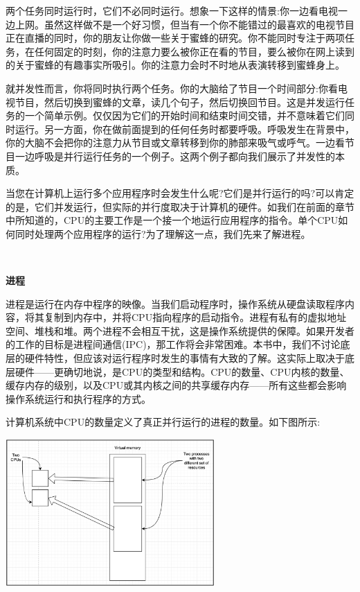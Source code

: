两个任务同时运行时，它们不必同时运行。想象一下这样的情景:你一边看电视一边上网。虽然这样做不是一个好习惯，但当有一个你不能错过的最喜欢的电视节目正在直播的同时，你的朋友让你做一些关于蜜蜂的研究。你不能同时专注于两项任务，在任何固定的时刻，你的注意力要么被你正在看的节目，要么被你在网上读到的关于蜜蜂的有趣事实所吸引。你的注意力会时不时地从表演转移到蜜蜂身上。 \par
就并发性而言，你将同时执行两个任务。你的大脑给了节目一个时间部分:你看电视节目，然后切换到蜜蜂的文章，读几个句子，然后切换回节目。这是并发运行任务的一个简单示例。仅仅因为它们的开始时间和结束时间交错，并不意味着它们同时运行。另一方面，你在做前面提到的任何任务时都要呼吸。呼吸发生在背景中，你的大脑不会把你的注意力从节目或文章转移到你的肺部来吸气或呼气。一边看节目一边呼吸是并行运行任务的一个例子。这两个例子都向我们展示了并发性的本质。 \par
当您在计算机上运行多个应用程序时会发生什么呢?它们是并行运行的吗?可以肯定的是，它们并发运行，但实际的并行度取决于计算机的硬件。如我们在前面的章节中所知道的，CPU的主要工作是一个接一个地运行应用程序的指令。单个CPU如何同时处理两个应用程序的运行?为了理解这一点，我们先来了解进程。 \par

\noindent\textbf{}\ \par
\textbf{进程} \ \par
进程是运行在内存中程序的映像。当我们启动程序时，操作系统从硬盘读取程序内容，将其复制到内存中，并将CPU指向程序的启动指令。进程有私有的虚拟地址空间、堆栈和堆。两个进程不会相互干扰，这是操作系统提供的保障。如果开发者的工作的目标是进程间通信(IPC)，那工作将会非常困难。本书中，我们不讨论底层的硬件特性，但应该对运行程序时发生的事情有大致的了解。这实际上取决于底层硬件——更确切地说，是CPU的类型和结构。CPU的数量、CPU内核的数量、缓存内存的级别，以及CPU或其内核之间的共享缓存内存——所有这些都会影响操作系统运行和执行程序的方式。 \par
计算机系统中CPU的数量定义了真正并行运行的进程的数量。如下图所示: \par

\begin{center}
	\includegraphics[width=0.6\textwidth]{content/Section-2/Chapter-8/2}
\end{center}

